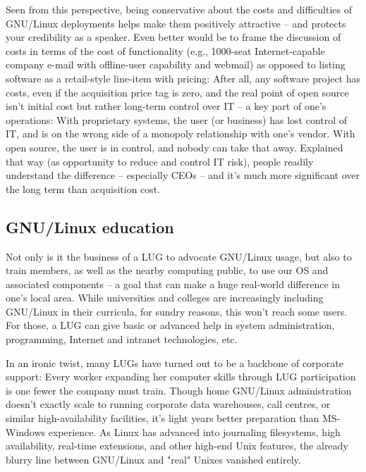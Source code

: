 \documentclass{HOWTO}
\begin{document}
Seen from this perspective, being conservative about the costs and
difficulties of GNU/Linux deployments helps make them positively attractive
-- and protects your credibility as a speaker.  Even better would be
to frame the discussion of costs in terms of the cost of functionality
(e.g., 1000-seat Internet-capable company e-mail with offline-user
capability and webmail) as opposed to listing software as a retail-style
line-item with pricing:  After all, any software project has costs,
even if the acquisition price tag is zero, and the real point of open
source isn't initial cost but rather long-term control over IT -- a key
part of one's operations:  With proprietary systems, the user (or
business) has lost control of IT, and is on the wrong side of a monopoly
relationship with one's vendor.  With open source, the user is in
control, and nobody can take that away.  Explained that way (as
opportunity to reduce and control IT risk), people readily understand
the difference -- especially CEOs -- and it's much more significant over
the long term than acquisition cost.




\subsection{GNU/Linux education}

Not only is it the business of a LUG to advocate GNU/Linux usage, but
also to train members, as well as the nearby computing public,
to use our OS and associated components -- a goal that can make a huge
real-world difference in one's local area.  While universities and
colleges are increasingly including GNU/Linux in their curricula, for
sundry reasons, this won't reach some users.  For those, a LUG can
give basic or advanced help in system administration, programming,
Internet and intranet technologies, etc.

In an ironic twist, many LUGs have turned out to be a backbone of
corporate support: Every worker expanding her computer skills through
LUG participation is one fewer the company must train.  Though home
GNU/Linux administration doesn't exactly scale to running corporate data
warehouses, call centres, or similar high-availability facilities, it's
light years better preparation than MS-Windows experience.  As Linux has
advanced into journaling filesystems, high availability, real-time
extensions, and other high-end Unix features, the already blurry line
between GNU/Linux and "real" Unixes vanished entirely.
\end{document}
